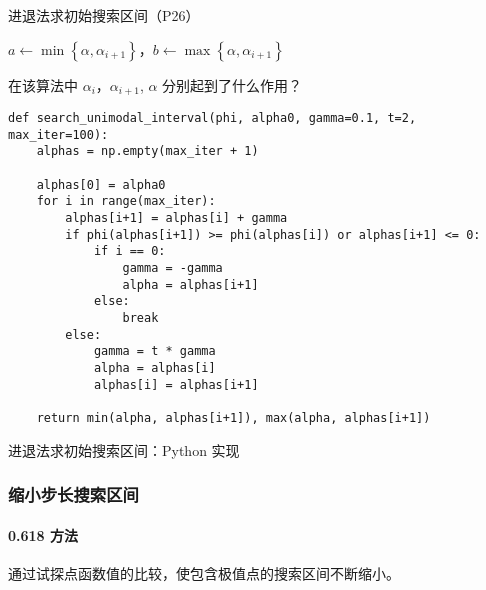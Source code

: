 \documentclass[cn,mtpro2,12pt]{elegantbook}
\begin{document}
\begin{algorithm}
    \caption{进退法求初始搜索区间（P26）}
    $a\leftarrow\min\left\{\alpha,\alpha_{i+1}\right\}$，$b\leftarrow\max\left\{\alpha,\alpha_{i+1}\right\}$\;
\end{algorithm}

\begin{remark}
    在该算法中 $\alpha_{i}$，$\alpha_{i+1}$, $\alpha$ 分别起到了什么作用？
\end{remark}

\begin{listing}
    \begin{verbatim}
def search_unimodal_interval(phi, alpha0, gamma=0.1, t=2, max_iter=100):
    alphas = np.empty(max_iter + 1)

    alphas[0] = alpha0
    for i in range(max_iter):
        alphas[i+1] = alphas[i] + gamma
        if phi(alphas[i+1]) >= phi(alphas[i]) or alphas[i+1] <= 0:
            if i == 0:
                gamma = -gamma
                alpha = alphas[i+1]
            else:
                break
        else:
            gamma = t * gamma
            alpha = alphas[i]
            alphas[i] = alphas[i+1]

    return min(alpha, alphas[i+1]), max(alpha, alphas[i+1])
    \end{verbatim}
    \caption{进退法求初始搜索区间：Python 实现}
\end{listing}

\subsubsection{缩小步长搜索区间}

\paragraph{0.618 方法}

通过试探点函数值的比较，使包含极值点的搜索区间不断缩小。
\end{document}
